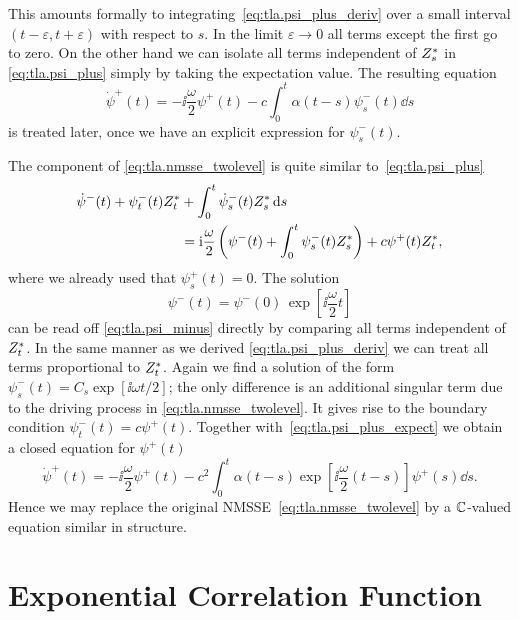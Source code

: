 This amounts formally to integrating~\ref{eq:tla.psi_plus_deriv} over a small interval $(t-\varepsilon, t+\varepsilon)$ with respect to $s$.
In the limit $\varepsilon \to 0$ all terms except the first go to zero.
On the other hand we can isolate all terms independent of ${Z}^*_s$ in \autoref{eq:tla.psi_plus} simply by taking the expectation value.
The resulting equation
\begin{equation}
  \dot\psi^+(t) = -\ii \frac{\omega}{2} \psi^+(t)  - c \int_0^t \alpha(t - s) \psi^-_s(t) \dd s
  \label{eq:psi_plus_expect}
\end{equation}
is treated later, once we have an explicit expression for $\psi^-_s(t)$.

The \quotes{-} component of \autoref{eq:tla.nmsse_twolevel} is quite similar to~\ref{eq:tla.psi_plus}
\begin{align}
  \dot\psi^-(t) + \psi^-_t(t){Z}^*_t &+ \int_0^t \dot\psi^-_s(t){Z}^*_s \, \mathrm{d} s \nonumber \\
  &= \mathrm{i} \frac{\omega}{2} \left( \psi^-(t) + \int_0^t \psi^-_s(t){Z}^*_s \right) + c \psi^+(t){Z}^*_t,
  \label{eq:tla.psi_minus}
\end{align}
where we already used that $\psi^+_s(t) = 0$.
The solution
\begin{equation}
  \psi^-(t) = \psi^-(0) \, \exp[\ii \frac{\omega}{2} t]
\end{equation}
can be read off \autoref{eq:tla.psi_minus} directly by comparing all terms independent of ${Z}^*_t$.
In the same manner as we derived \autoref{eq:tla.psi_plus_deriv} we can treat all terms proportional to ${Z}^*_t$.
Again we find a solution of the form $\psi^-_s(t) = C_s \exp[\ii\omega t / 2]$; the only difference is an additional singular term due to the driving process in \autoref{eq:tla.nmsse_twolevel}.
It gives rise to the boundary condition $\psi^-_t(t) = c \psi^+(t)$.
Together with~\ref{eq:tla.psi_plus_expect} we obtain a closed equation for $\psi^+(t)$
\begin{equation}
  \dot\psi^+(t) = -\ii \frac{\omega}{2} \psi^+(t) - c^2 \int_0^t \alpha(t - s) \exp[\ii \frac{\omega}{2} (t - s)] \psi^+(s) \dd s.
  \label{eq:tla.psi_plus_eq}
\end{equation}
Hence we may replace the original NMSSE~\ref{eq:tla.nmsse_twolevel} by a $\mathbb{C}$-valued equation similar in structure.


\section{Exponential Correlation Function}
\label{sec:tla.exp}


